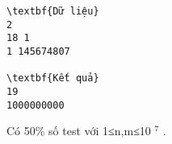 \begin{verbatim}
\textbf{Dữ liệu}
2
18 1
1 145674807	

\textbf{Kết quả}
19
1000000000
\end{verbatim}
Có 50\% số test với 1≤n,m≤10   $^    7   $   .